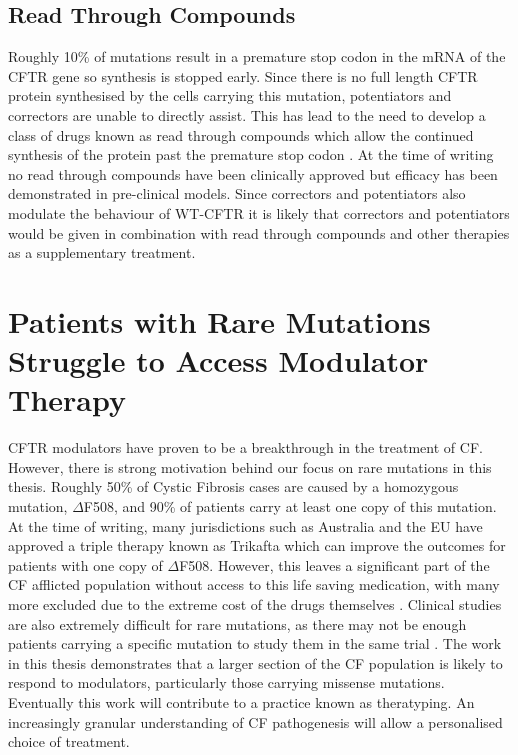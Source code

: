\subsection{Read Through Compounds}
Roughly 10\% of mutations result in a premature stop codon in the mRNA of the CFTR gene so synthesis is stopped early. Since there is no full length CFTR protein synthesised by the cells carrying this mutation, potentiators and correctors are unable to directly assist. This has lead to the need to develop a class of drugs known as read through compounds which allow the continued synthesis of the protein past the premature stop codon \cite{sharma2021}. At the time of writing no read through compounds have been clinically approved but efficacy has been demonstrated in pre-clinical models\cite{crawford2021}. Since correctors and potentiators also modulate the behaviour of WT-CFTR it is likely that correctors and potentiators would be given in combination with read through compounds and other therapies as a supplementary treatment.

\section{Patients with Rare Mutations Struggle to Access Modulator Therapy}
CFTR modulators have proven to be a breakthrough in the treatment of CF. However, there is strong motivation behind our focus on rare mutations in this thesis. Roughly 50\% of Cystic Fibrosis cases are caused by a homozygous mutation, $\Delta$F508, and 90\% of patients carry at least one copy of this mutation. At the time of writing, many jurisdictions such as Australia and the EU have approved a triple therapy known as Trikafta which can improve the outcomes for patients with one copy of $\Delta$F508. However, this leaves a significant part of the CF afflicted population without access to this life saving medication, with many more excluded due to the extreme cost of the drugs themselves \cite{administration2021, trikafta_website, abdallah2021, guo2022a}. Clinical studies are also extremely difficult for rare mutations, as there may not be enough patients carrying a specific mutation to study them in the same trial \cite{grody2007}. The work in this thesis demonstrates that a larger section of the CF population is likely to respond to modulators, particularly those carrying missense mutations. Eventually this work will contribute to a practice known as theratyping. An increasingly granular understanding of CF pathogenesis will allow a personalised choice of treatment.


